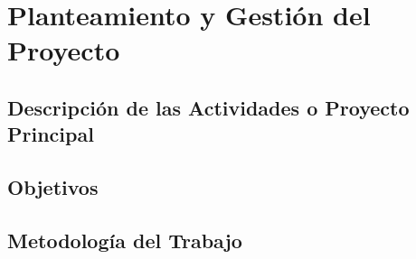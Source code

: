 \chapter{Planteamiento y Gestión del Proyecto}
\label{cp:planning-management}

\section{Descripción de las Actividades o Proyecto Principal}

\section{Objetivos}

\section{Metodología del Trabajo}
